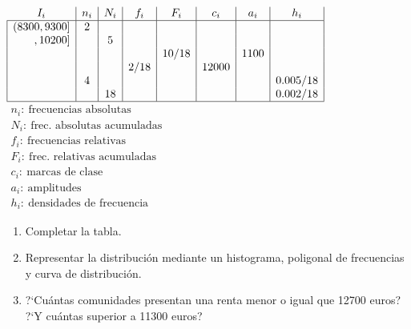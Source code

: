 \documentclass[11pt]{book}
\begin{document}
\begin{enumerate}
$\begin{array}{|r|c|c|c|c|c|c|c|}
  \multicolumn{1}{c|}{I_{i}} & n_{i} & N_{i} & f_{i} & F_{i} & c_{i} & a_{i} & h_{i} \\
  \hline
  (8300,9300] & 2 &  &  &  &  &  &  \\
  ,10200] &  & 5 &  &  &  &  &  \\
   &  &  &  & 10/18 &  & 1100 &  \\
   &  &  & 2/18 &  & 12000 &  &  \\
   & 4 &  &  &  &  &  & 0\mbox{.}005/18 \\
   &  & 18 &  &  &  &  & 0\mbox{.}002/18 \\  \hline
\end{array}$ \hskip 1cm $\begin{array}{l}  n_i: \ \mbox{frecuencias absolutas} \\ N_i:  \ \mbox{frec. absolutas acumuladas}\\ f_i:  \ \mbox{frecuencias relativas}
\\ F_i:  \ \mbox{frec. relativas acumuladas}\\ c_i:  \ \mbox{marcas de clase}\\ a_i:  \ \mbox{amplitudes} \\ h_i:  \ \mbox{densidades de frecuencia}\end{array}$
\begin{enumerate}
    \item Completar la tabla.
    \item Representar la distribuci{\'o}n mediante un histograma,
    poligonal de frecuencias y curva de distribuci{\'o}n.
    \item ?`Cu{\'a}ntas comunidades presentan una renta menor o igual
    que 12700 euros? ?`Y cu{\'a}ntas superior a 11300 euros?
\end{enumerate}
\newpage


\end{enumerate}
\end{document}
